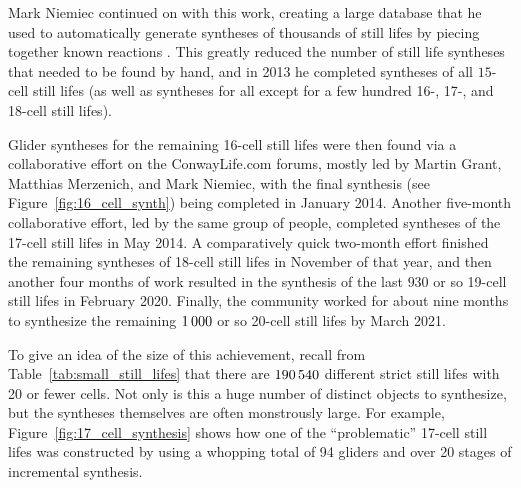 Mark Niemiec continued on with this work, creating a large database that he used to automatically generate syntheses of thousands of still lifes by piecing together known reactions \cite{Nie03,Nie10}. This greatly reduced the number of still life syntheses that needed to be found by hand, and in 2013 he completed syntheses of all $15$-cell still lifes (as well as syntheses for all except for a few hundred 16-, 17-, and 18-cell still lifes).

Glider syntheses for the remaining 16-cell still lifes were then found via a collaborative effort on the ConwayLife.com forums, mostly led by Martin Grant, Matthias Merzenich, and Mark Niemiec, with the final synthesis (see Figure~\ref{fig:16_cell_synth}) being completed in January 2014. Another five-month collaborative effort, led by the same group of people, completed syntheses of the 17-cell still lifes in May 2014. A comparatively quick two-month effort finished the remaining syntheses of 18-cell still lifes in November of that year, and then another four months of work resulted in the synthesis of the last $930$ or so 19-cell still lifes in February 2020. Finally, the community worked for about nine months to synthesize the remaining $1{\,}000$ or so 20-cell still lifes by March 2021.

To give an idea of the size of this achievement, recall from Table~\ref{tab:small_still_lifes} that there are $190{\,}540$ different strict still lifes with 20 or fewer cells. Not only is this a huge number of distinct objects to synthesize, but the syntheses themselves are often monstrously large. For example, Figure~\ref{fig:17_cell_synthesis} shows how one of the ``problematic'' 17-cell still lifes was constructed by using a whopping total of 94 gliders and over 20 stages of incremental synthesis.

